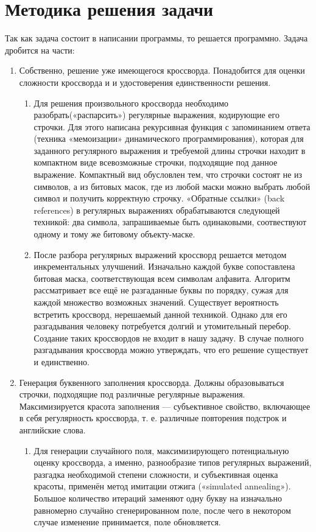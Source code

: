 \documentclass[12pt]{report}
\begin{document}
\section{Методика решения задачи}
Так как задача состоит в написании программы, то решается программно. Задача дробится на части: 
\begin{enumerate} 
\item Собственно, решение уже имеющегося кроссворда. Понадобится для оценки сложности кроссворда и и удостоверения единственности решения.

\begin{enumerate} 
\item Для решения произвольного кроссворда необходимо разобрать(«распарсить») регулярные выражения, кодирующие его строчки. Для этого написана рекурсивная функция с запоминанием ответа (техника «мемоизации» динамического программирования), которая для заданного регулярного выражения и требуемой длины строчки находит в компактном виде всевозможные строчки, подходящие под данное выражение. Компактный вид обусловлен тем, что строчки состоят не из символов, а из битовых масок, где из любой маски можно выбрать любой символ и получить корректную строчку. «Обратные ссылки» (back references) в регулярных выражениях обрабатываются следующей техникой: два символа, запрашиваемые быть одинаковыми, соотвествуют одному и тому же битовому объекту-маске.
\item После разбора регулярных выражений кроссворд решается методом инкрементальных улучшений. Изначально каждой букве сопоставлена битовая маска, соответствующая всем символам алфавита. Алгоритм рассматривает все ещё не разгаданные буквы по порядку, сужая для каждой множество возможных значений. Существует вероятность встретить кроссворд, нерешаемый данной техникой. Однако для его разгадывания человеку потребуется долгий и утомительный перебор. Создание таких кроссвордов не входит в нашу задачу. В случае полного разгадывания кроссворда можно утверждать, что его решение существует и единственно.
\end{enumerate} 

\newpage

\item Генерация буквенного заполнения кроссворда. Должны образовываться строчки, подходящие под различные регулярные выражения. Максимизируется красота заполнения — субъективное свойство, включающее в себя регулярность кроссворда, т. е. различные повторения подстрок и английские слова.
\begin{enumerate} 
\item Для генерации случайного поля, максимизирующего потенциальную оценку кроссворда, а именно, разнообразие типов регулярных выражений, разгадка необходимой степени сложности, и субъективная оценка красоты, применён метод имитации отжига («simulated annealing»). Большое количество итераций заменяют одну букву на изначально равномерно случайно сгенерированном поле, после чего в некотором случае изменение принимается, поле обновляется.
\end{enumerate} 


\end{enumerate}
\end{document}
